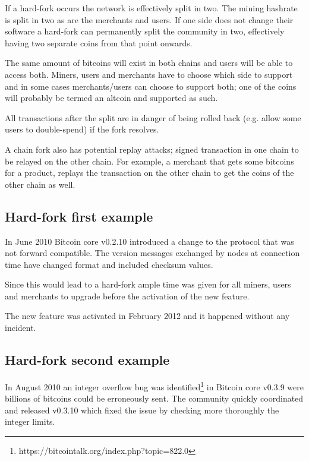If a hard-fork occurs the network is effectively split in two. The mining hashrate is split in two as are the merchants and users. If one side does not change their software a hard-fork can permanently split the community in two, effectively having two separate coins from that point onwards.

The same amount of bitcoins will exist in both chains and users will be able to access both. Miners, users and merchants have to choose which side to support and in some cases merchants/users can choose to support both; one of the coins will probably be termed an altcoin and supported as such.

All transactions after the split are in danger of being rolled back (e.g. allow some users to double-spend) if the fork resolves. 

A chain fork also has potential replay attacks; signed transaction in one chain to be relayed on the other chain. For example, a merchant that gets some bitcoins for a product, replays the transaction on the other chain to get the coins of the other chain as well.

\subsection*{Hard-fork first example}
In June 2010 Bitcoin core v0.2.10 introduced a change to the protocol that was not forward compatible. The version messages exchanged by nodes at connection time have changed format and included checksum values.

Since this would lead to a hard-fork ample time was given for all miners, users and merchants to upgrade before the activation of the new feature.

The new feature was activated in February 2012 and it happened without any incident.


\subsection*{Hard-fork second example}
In August 2010 an integer overflow bug was identified\footnote{https://bitcointalk.org/index.php?topic=822.0} in Bitcoin core v0.3.9 were billions of bitcoins could be erroneously sent. The community quickly coordinated and released v0.3.10 which fixed the issue by checking more thoroughly the integer limits.

